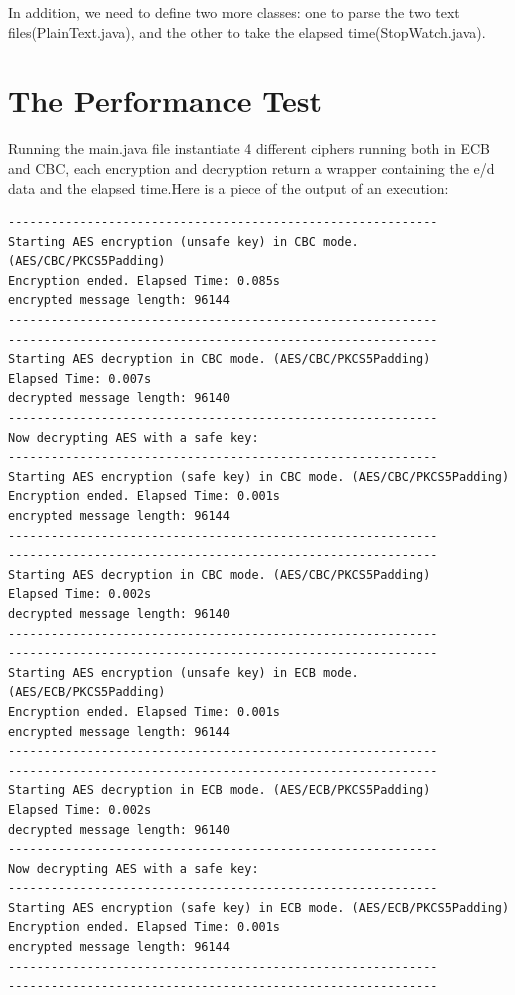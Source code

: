 \documentclass{article}
\begin{document}
	
In addition, we need to define two more classes: one to parse the two text files(PlainText.java), and the other to take the elapsed time(StopWatch.java).


	\section{The Performance Test}\label{sec:encJava}
		Running the main.java file instantiate 4 different ciphers running both in ECB and CBC, each encryption and decryption return a wrapper containing the e/d data and the elapsed time.Here is a piece of the output of an execution:
		
		\begin{verbatim}
------------------------------------------------------------
Starting AES encryption (unsafe key) in CBC mode. (AES/CBC/PKCS5Padding)
Encryption ended. Elapsed Time: 0.085s
encrypted message length: 96144
------------------------------------------------------------
------------------------------------------------------------
Starting AES decryption in CBC mode. (AES/CBC/PKCS5Padding)
Elapsed Time: 0.007s
decrypted message length: 96140
------------------------------------------------------------
Now decrypting AES with a safe key:
------------------------------------------------------------
Starting AES encryption (safe key) in CBC mode. (AES/CBC/PKCS5Padding)
Encryption ended. Elapsed Time: 0.001s
encrypted message length: 96144
------------------------------------------------------------
------------------------------------------------------------
Starting AES decryption in CBC mode. (AES/CBC/PKCS5Padding)
Elapsed Time: 0.002s
decrypted message length: 96140
------------------------------------------------------------
------------------------------------------------------------
Starting AES encryption (unsafe key) in ECB mode. (AES/ECB/PKCS5Padding)
Encryption ended. Elapsed Time: 0.001s
encrypted message length: 96144
------------------------------------------------------------
------------------------------------------------------------
Starting AES decryption in ECB mode. (AES/ECB/PKCS5Padding)
Elapsed Time: 0.002s
decrypted message length: 96140
------------------------------------------------------------
Now decrypting AES with a safe key:
------------------------------------------------------------
Starting AES encryption (safe key) in ECB mode. (AES/ECB/PKCS5Padding)
Encryption ended. Elapsed Time: 0.001s
encrypted message length: 96144
------------------------------------------------------------
------------------------------------------------------------

\end{verbatim}
\end{document}
